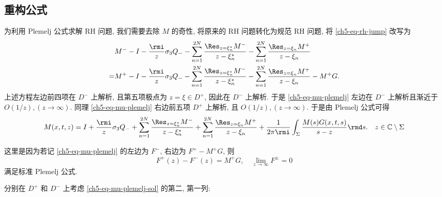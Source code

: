 \subsection{重构公式}
为利用 Plemelj 公式求解 RH 问题, 我们需要去除 $M$ 的奇性, 将原来的 RH 问题转化为规范 RH 问题, 将 \eqref{ch5-eq-rh-jump} 改写为
\begin{equation}
    \begin{aligned}
          & M^{-} - I - \frac{\rmi}{z} \sigma_{3} Q_{-} - \sum_{n=1}^{2N} \frac{\Res_{z = \xi_{n}^{*}} M^{-}}{z - \xi_{n}^{*}} - \sum_{n=1}^{2N} \frac{\Res_{z=\xi_{n}} M^{+}}{z - \xi_{n}}            \\
        = & M^{+} - I - \frac{\rmi}{z} \sigma_{3} Q_{-} - \sum_{n=1}^{2N} \frac{\Res_{z = \xi_{n}^{*}} M^{-}}{z - \xi_{n}^{*}} - \sum_{n=1}^{2N} \frac{\Res_{z=\xi_{n}} M^{+}}{z - \xi_{n}} - M^{+} G.
    \end{aligned}
    \label{ch5-eq-mu-plemelj}
\end{equation}
上述方程左边前四项在 $D^{-}$ 上解析, 且第五项极点为 $z = \xi \in D^{+}$, 因此在 $D^{-}$ 上解析. 于是 \eqref{ch5-eq-mu-plemelj} 左边在 $D^{-}$ 上解析且渐近于 $O(1/z), (z \to \infty)$. 同理 \eqref{ch5-eq-mu-plemelj} 右边前五项 $D^{+}$ 上解析, 且 $O(1/z), (z \to \infty)$. 于是由 Plemelj 公式可得
\begin{equation}
    M(x,t,z) = I + \frac{\rmi}{z} \sigma_{3} Q_{-} + \sum_{n=1}^{2N} \frac{\Res_{z = \xi_{n}^{*}} M^{-}}{z - \xi_{n}^{*}} + \sum_{n=1}^{2N} \frac{\Res_{z=\xi_{n}} M^{+}}{z - \xi_{n}} + \frac{1}{2\pi \rmi} \int_{\Sigma} \frac{M(s) G(x,t,s)}{s - z} \rmd s. \quad z \in \mathbb{C} \setminus \Sigma
    \label{ch5-eq-mu-plemelj-sol}
\end{equation}
\begin{remark}
    这里是因为若记 \eqref{ch5-eq-mu-plemelj} 的左边为 $F^{-}$, 右边为 $F^{+}-M^{+}G$, 则
    \begin{equation}
        F^{+}(z) - F^{-}(z) = M^{+}G, \quad \lim_{z \to \infty} F^{\pm} = 0
    \end{equation}
    满足标准 Plemelj 公式.
\end{remark}
分别在 $D^{+}$ 和 $D^{-}$ 上考虑 \eqref{ch5-eq-mu-plemelj-sol} 的第二, 第一列:


